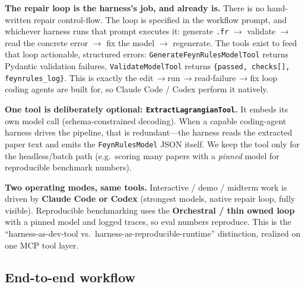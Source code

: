 \documentclass[11pt]{article}
\newcommand{\code}[1]{\texttt{#1}}
\newcommand{\arw}{$\rightarrow$}
\begin{document}
\noindent\textbf{The repair loop is the harness's job, and already is.} There is
no hand-written repair control-flow. The loop is specified in the workflow
prompt, and whichever harness runs that prompt executes it: generate \code{.fr}
\arw{} validate \arw{} read the concrete error \arw{} fix the model \arw{}
regenerate. The tools exist to feed that loop actionable, structured errors:
\code{GenerateFeynRulesModelTool} returns Pydantic validation failures,
\code{ValidateModelTool} returns \code{\{passed, checks[], feynrules\_log\}}. This
is exactly the edit\,\arw{}run\,\arw{}read-failure\,\arw{}fix loop coding agents
are built for, so Claude Code / Codex perform it natively.

\noindent\textbf{One tool is deliberately optional: \code{ExtractLagrangianTool}.}
It embeds its own model call (schema-constrained decoding). When a capable
coding-agent harness drives the pipeline, that is redundant---the harness reads
the extracted paper text and emits the \code{FeynRulesModel} JSON itself. We keep
the tool only for the headless/batch path (e.g.\ scoring many papers with a
\emph{pinned} model for reproducible benchmark numbers).

\noindent\textbf{Two operating modes, same tools.} Interactive / demo / midterm
work is driven by \textbf{Claude Code or Codex} (strongest models, native repair
loop, fully visible). Reproducible benchmarking uses the \textbf{Orchestral /
thin owned loop} with a pinned model and logged traces, so eval numbers
reproduce. This is the ``harness-as-dev-tool vs.\ harness-as-reproducible-runtime''
distinction, realized on one MCP tool layer.

\subsection{End-to-end workflow}
\end{document}
